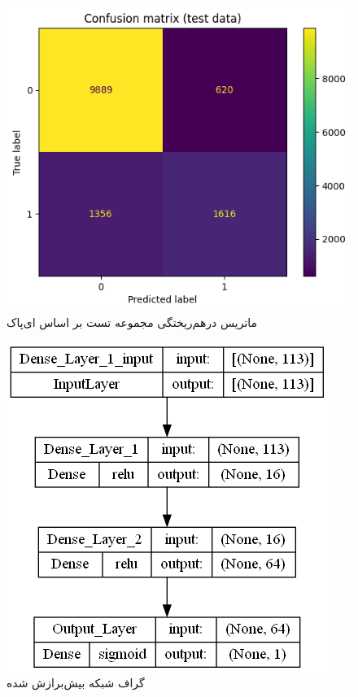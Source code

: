 \documentclass{article}
\begin{document}
\begin{figure}[!h]
    \centering\includegraphics[scale=.55]{./p7-4}
    \caption{ماتریس درهم‌ریختگی مجموعه تست بر اساس ای‌پاک}\label{fig.74}
\end{figure}

\cleardoublepage

\begin{figure}[!h]
    \centering\includegraphics[scale=.55]{./p7-5}
    \caption{گراف شبکه بیش‌برازش شده}\label{fig.75}
\end{figure}
\end{document}
